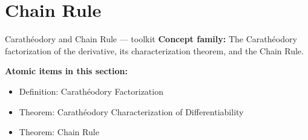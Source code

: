 \section{Chain Rule}

\begin{toolkitbox}{Carath\'{e}odory and Chain Rule --- toolkit}
\textbf{Concept family:} The Carath\'{e}odory factorization of the derivative, its characterization theorem, and the Chain Rule.

\medskip
\textbf{Atomic items in this section:}
\begin{itemize}
  \item Definition: Carath\'{e}odory Factorization
  \item Theorem: Carath\'{e}odory Characterization of Differentiability
  \item Theorem: Chain Rule
\end{itemize}
\end{toolkitbox}


